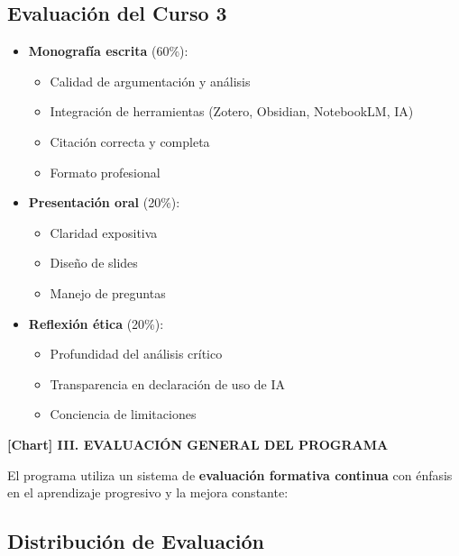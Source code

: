 \documentclass[12pt,a4paper]{yaac-luatex}
\newcommand{\faChartBar}{[Chart]}
\newcommand{\secciontitulo}[1]{
	\vspace{0.5cm}
	\begin{tcolorbox}[
		enhanced,
		colback=maincolor,
		colframe=maincolor,
		arc=3pt,
		boxrule=0pt,
		left=8pt,
		right=8pt,
		top=6pt,
		bottom=6pt
		]
		{\color{white}\large\bfseries #1}
	\end{tcolorbox}
}
\begin{document}
	\vspace{0.5cm}
	
	\subsection*{Evaluación del Curso 3}
	
	\begin{itemize}[leftmargin=*, itemsep=0.2cm]
		\item \textbf{Monografía escrita} (60\%):
		\begin{itemize}
			\item Calidad de argumentación y análisis
			\item Integración de herramientas (Zotero, Obsidian, NotebookLM, IA)
			\item Citación correcta y completa
			\item Formato profesional
		\end{itemize}
		\item \textbf{Presentación oral} (20\%):
		\begin{itemize}
			\item Claridad expositiva
			\item Diseño de slides
			\item Manejo de preguntas
		\end{itemize}
		\item \textbf{Reflexión ética} (20\%):
		\begin{itemize}
			\item Profundidad del análisis crítico
			\item Transparencia en declaración de uso de IA
			\item Conciencia de limitaciones
		\end{itemize}
	\end{itemize}
	
	\newpage
	
	\secciontitulo{\faChartBar \hspace{0.3em} III. EVALUACIÓN GENERAL DEL PROGRAMA}
	
	El programa utiliza un sistema de \textbf{evaluación formativa continua} con énfasis en el aprendizaje progresivo y la mejora constante:
	
	\subsection*{Distribución de Evaluación}
	
\end{document}
